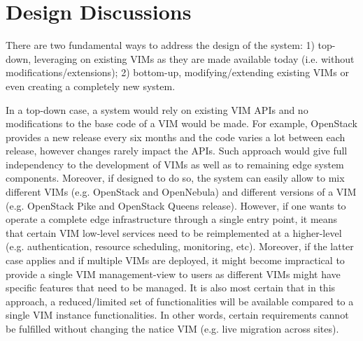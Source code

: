 


\section{Design Discussions}
\label{sec:design_discussion}

There are two fundamental ways to address the design of the system: 1) top-down, leveraging on existing VIMs as they are made available today (i.e. without modifications/extensions); 2) bottom-up, modifying/extending existing VIMs or even creating a completely new system. 

In a top-down case, a system  would rely on existing VIM APIs and no modifications to the base code of a VIM would be made. For example, OpenStack provides a new release every six months and the code varies a lot between each release, however changes rarely impact the APIs. Such approach would give full independency to the development of VIMs as well as to remaining edge system components. Moreover, if designed to do so, the system can easily allow to mix different VIMs (e.g. OpenStack and OpenNebula) and different versions of a VIM (e.g. OpenStack Pike and OpenStack Queens release). 
However, if one wants to operate a complete edge infrastructure through a single entry point, it means that certain VIM low-level services need to be reimplemented at a higher-level (e.g. authentication, resource scheduling, monitoring, etc). Moreover, if the latter case applies and if multiple VIMs are deployed, it might become impractical to provide a single VIM management-view to users as different VIMs might have specific features that need to be managed. It is also most certain that in this approach, a reduced/limited set of functionalities will be available compared to a single VIM instance functionalities. In other words, certain requirements cannot be fulfilled without changing the natice VIM (e.g. live migration across sites).





